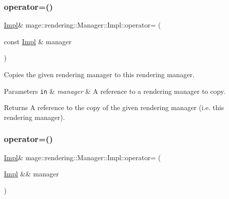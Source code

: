 \subsubsection{\texorpdfstring{operator=()}{operator=()}\hspace{0.1cm}{\footnotesize\ttfamily [1/2]}}
{\footnotesize\ttfamily \mbox{\hyperlink{classmage_1_1rendering_1_1_manager_1_1_impl}{Impl}}\& mage\+::rendering\+::\+Manager\+::\+Impl\+::operator= (\begin{DoxyParamCaption}\item[{const \mbox{\hyperlink{classmage_1_1rendering_1_1_manager_1_1_impl}{Impl}} \&}]{manager }\end{DoxyParamCaption})\hspace{0.3cm}{\ttfamily [delete]}}

Copies the given rendering manager to this rendering manager.


\begin{DoxyParams}[1]{Parameters}
\mbox{\tt in}  & {\em manager} & A reference to a rendering manager to copy. \\
\hline
\end{DoxyParams}
\begin{DoxyReturn}{Returns}
A reference to the copy of the given rendering manager (i.\+e. this rendering manager). 
\end{DoxyReturn}
\mbox{\label{classmage_1_1rendering_1_1_manager_1_1_impl_a3dfc877c5737abc5020cf700dec8eb60}} 
\subsubsection{\texorpdfstring{operator=()}{operator=()}\hspace{0.1cm}{\footnotesize\ttfamily [2/2]}}
{\footnotesize\ttfamily \mbox{\hyperlink{classmage_1_1rendering_1_1_manager_1_1_impl}{Impl}}\& mage\+::rendering\+::\+Manager\+::\+Impl\+::operator= (\begin{DoxyParamCaption}\item[{\mbox{\hyperlink{classmage_1_1rendering_1_1_manager_1_1_impl}{Impl}} \&\&}]{manager }\end{DoxyParamCaption})\hspace{0.3cm}{\ttfamily [delete]}}

